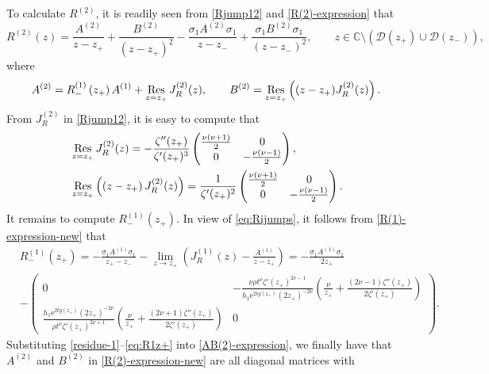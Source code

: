 \documentclass[11pt,a4paper]{article}
\numberwithin{equation}{section}
\def\Res {\mathop{\rm Res}\nolimits}
\begin{document}
To calculate $R^{(2)}$, it is readily seen from \eqref{Rjump12} and \eqref{R(2)-expression} that
\begin{equation}\label{R(2)-expression-new}
R^{(2)}(z)=\frac{A^{(2)}}{z-z_+}+\frac{B^{(2)}}{\left(z-z_+\right)^2}
-\frac{\sigma_1A^{(2)}\sigma_1}{z-z_-}+\frac{\sigma_1B^{(2)}\sigma_1}{\left(z-z_-\right)^2}, \qquad z\in\mathbb{C}\setminus \left(\mathcal{D}(z_+)\cup\mathcal{D}(z_-)\right),
\end{equation}
where
\begin{equation}\label{AB(2)-expression}
A^{(2)}=R^{(1)}_-\left(z_+\right) A^{(1)}+\Res\limits_{z=z_+}J_R^{(2)}(z),\qquad
B^{(2)}=\Res\limits_{z=z_+}\left((z-z_+) J_R^{(2)}(z)\right).
\end{equation}
From $J_R^{(2)}$ in \eqref{Rjump12}, it is easy to compute that
\begin{align}
&\Res\limits_{z=z_+}J_R^{(2)}(z)=-\frac{\zeta''(z_+)}{\zeta'(z_+)^3}\begin{pmatrix} \frac{\nu(\nu+1)}{2} & 0 \\ 0 & -\frac{\nu(\nu-1)}{2}\end{pmatrix},\label{residue-1}\\
&\Res\limits_{z=z_+}\left(\left(z-z_+\right) J_R^{(2)}(z)\right)=\frac{1}{\zeta'(z_+)^2}\begin{pmatrix} \frac{\nu(\nu+1)}{2} & 0 \\ 0 & -\frac{\nu(\nu-1)}{2}\end{pmatrix}.\label{residue-2}
\end{align}
It remains to compute $R^{(1)}_-\left(z_+\right)$. In view of \eqref{eq:Rijumps}, it follows from \eqref{R(1)-expression-new} that
\begin{align}\label{eq:R1z+}
&R^{(1)}_-\left(z_+\right)=-\frac{\sigma_1A^{(1)}\sigma_1}{z_+-z_-}
-\lim\limits_{z\to{z}_+}\left(J_R^{(1)}(z)-\frac{A^{(1)}}{z-z_+}\right)
=-\frac{\sigma_1A^{(1)}\sigma_1}{2z_+}\nonumber\\
&-\begin{pmatrix} 0 & -\frac{\nu\rho{t}^{\nu}\zeta'(z_+)^{2\nu-1}}
{h_1\mathrm{e}^{2tg(z_+)}(2z_+)^{-2\nu}}
\left(\frac{\nu}{z_+}+\frac{(2\nu-1)\zeta''(z_+)}{2\zeta'(z_+)}\right) \\ \frac{h_1\mathrm{e}^{2tg(z_+)}(2z_+)^{-2\nu}}
{\rho{t}^{\nu}\zeta'(z_+)^{2\nu+1}}
\left(\frac{\nu}{z_+}+\frac{(2\nu+1)\zeta''(z_+)}{2\zeta'(z_+)}\right) & 0 \end{pmatrix}.
\end{align}
Substituting \eqref{residue-1}--\eqref{eq:R1z+} into \eqref{AB(2)-expression}, we finally have that $A^{(2)}$ and $B^{(2)}$ in \eqref{R(2)-expression-new} are all diagonal matrices with
\end{document}
